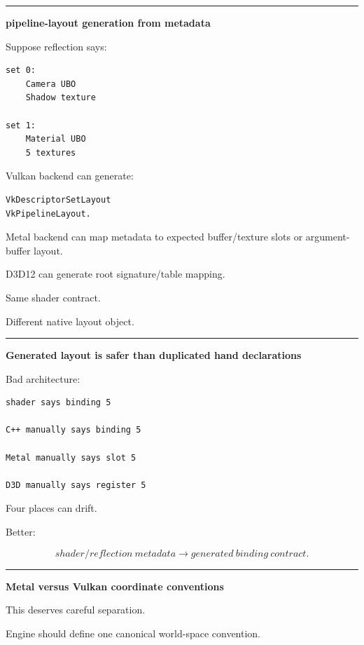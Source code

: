\begin{center}\rule{0.5\linewidth}{0.5pt}\end{center}

\textbf{pipeline-layout generation from metadata}

Suppose reflection says:

\begin{verbatim}
set 0:
    Camera UBO
    Shadow texture

set 1:
    Material UBO
    5 textures
\end{verbatim}

Vulkan backend can generate:

\begin{verbatim}
VkDescriptorSetLayout
VkPipelineLayout.
\end{verbatim}

Metal backend can map metadata to expected buffer/texture slots or argument-buffer layout.

D3D12 can generate root signature/table mapping.

Same shader contract.

Different native layout object.

\begin{center}\rule{0.5\linewidth}{0.5pt}\end{center}

\textbf{Generated layout is safer than duplicated hand declarations}

Bad architecture:

\begin{verbatim}
shader says binding 5

C++ manually says binding 5

Metal manually says slot 5

D3D manually says register 5
\end{verbatim}

Four places can drift.

Better:

\[
shader/reflection\ metadata
\rightarrow
generated\ binding\ contract.
\]

\begin{center}\rule{0.5\linewidth}{0.5pt}\end{center}

\textbf{Metal versus Vulkan coordinate conventions}

This deserves careful separation.

Engine should define one canonical world-space convention.


